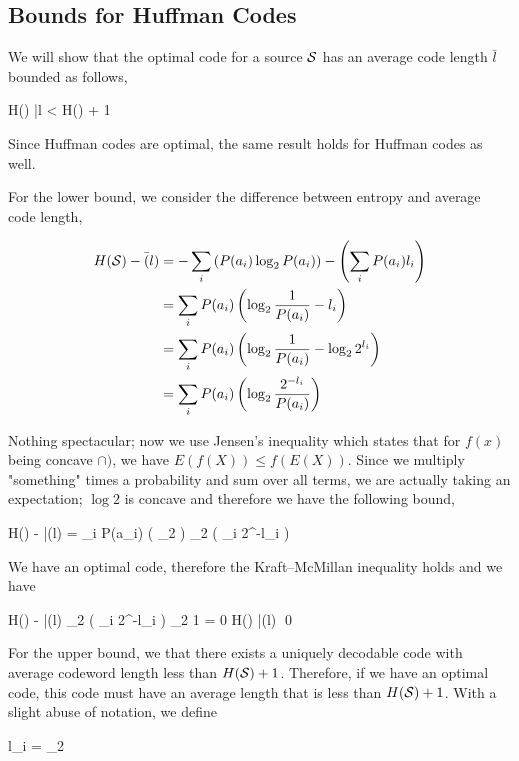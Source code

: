
\subsection{Bounds for Huffman Codes}

We will show that the optimal code for a source $\mathcal{S}$ has an average code length $\bar{l}$ bounded as follows,

\bee
H(\Sc) \leq \bar{l} < H(\Sc) + 1
\eee

Since Huffman codes are optimal, the same result holds for Huffman codes as well.

For the lower bound, we consider the difference between entropy and average code length,

\begin{align*}
    H(\mathcal{S}) - \bar(l) &= - \sum_i \left( P(a_i) \log_2 P(a_i) \right) - \left( \sum_i P(a_i) l_i \right) \\
    &= \sum_i P(a_i) \left( \log_2 \frac{1}{P(a_i)} - l_i \right) \\
    &= \sum_i P(a_i) \left( \log_2 \frac{1}{P(a_i)} - \log_2 2^{l_i} \right) \\
    &= \sum_i P(a_i) \left( \log_2 \frac{2^{-l_i}}{P(a_i)} \right)
\end{align*}

Nothing spectacular; now we use Jensen's inequality which states that for $f(x)$ being concave $\cap)$, we have $E(f(X)) \leq f(E(X))$. Since we multiply "something" times a probability and sum over all terms, we are actually taking an expectation; $\log2$ is concave and therefore we have the following bound,

\bee
H(\Sc) - \bar(l) = \sum_i P(a_i) \left( \log_2  \right) \leq \log_2 \left( \sum_i 2^{-l_i} \right)
\eee

We have an optimal code, therefore the Kraft–McMillan inequality holds and we have

\bee
H(\Sc) - \bar(l) \leq \log_2 \left( \sum_i 2^{-l_i} \right) \leq \log_2 1 = 0 \rightarrow H(\Sc) \leq \bar(l) \qed
\eee

For the upper bound, we that there exists a uniquely decodable code with average codeword length less than $H(\mathcal{S}) + 1$. Therefore, if we have an optimal code, this code must have an average length that is less than $H(\mathcal{S}) + 1$. With a slight abuse of notation, we define

\bee
l_i = \lceil \log_2  \rceil
\eee

